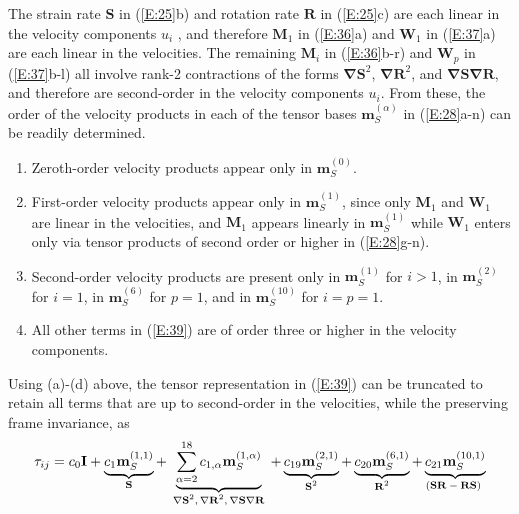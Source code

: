 The strain rate $\mathbf{S}$ in (\ref{E:25}b) and rotation rate $\mathbf{R}$ in (\ref{E:25}c) are each linear in the velocity components $u_i$ , and therefore  $\mathbf{M}_1$ in (\ref{E:36}a) and $\mathbf{W}_1$  in (\ref{E:37}a) are each linear in the velocities.  The remaining $\mathbf{M}_i$  in (\ref{E:36}b-r) and  $\mathbf{W}_p$ in (\ref{E:37}b-l) all involve rank-2 contractions of the forms $\mathbf{\nabla S}^2$, $\mathbf{\nabla R}^2$, and $\mathbf{\nabla S \nabla R}$, and therefore are second-order in the velocity components $u_i$.  From these, the order of the velocity products in each of the tensor bases $\mathbf{m}^{(\alpha)}_{S}$  in (\ref{E:28}a-n) can be readily determined.  
%
\begin{enumerate}[label=\emph({\alph*})]
%	
	\item	Zeroth-order velocity products appear only in $\mathbf{m}^{(0)}_{S}$.  
%	
	\item   First-order velocity products appear only in $\mathbf{m}^{(1)}_{S}$, since only   $\mathbf{M}_{1}$  and $\mathbf{W}_{1}$ are linear in the velocities, and $\mathbf{M}_{1}$   appears linearly in  $\mathbf{m}^{(1)}_{S}$ while  $\mathbf{W}_{1}$ enters only via tensor products of second order or higher in (\ref{E:28}g-n).  
%	
	\item   Second-order velocity products are present only in $\mathbf{m}^{(1)}_{S}$ for $i > 1$, in $\mathbf{m}^{(2)}_{S}$  for $i=1$, in  $\mathbf{m}^{(6)}_{S}$ for $p=1$, and in $\mathbf{m}^{(10)}_{S}$  for $i = p = 1$.
%	
	\item   All other terms in (\ref{E:39}) are of order three or higher in the velocity components.
%
\end{enumerate}
%
%   

Using (a)-(d) above, the tensor representation in (\ref{E:39}) can be truncated to retain all terms that are up to second-order in the velocities, while the preserving frame invariance, as
%
\begin{equation}
\label{E:41}
	\mathbf{\tau}_{ij} =  c_{0} \mathbf{I}
	+ \underbrace{
				c_{1} \mathbf{m}^{(1,1)}_{S}
				} %
				_{\text{\textbf{S}}}
	+ \underbrace{
				\sum_{\alpha=2}^{18} c_{1,\alpha} \mathbf{m}^{(1,\alpha)}_{S}
				 } %
				_{\text{ $ \mathbf{\nabla S}^{2}, \mathbf{\nabla R}^{2}, \mathbf{\nabla S \nabla R}$ }}
	+ \underbrace{
				c_{19} \mathbf{m}^{(2,1)}_{S}
				}%
				_{\text{ $\mathbf{S}^2$ }}
	+ \underbrace{
				c_{20} \mathbf{m}^{(6,1)}_{S}
				}%
				_{\text{ $\mathbf{R}^2$ }}
	+ \underbrace{
				c_{21} \mathbf{m}^{(10,1)}_{S}
				}%
				_{\text{$(\mathbf{SR-RS})$ }}
\end{equation}
%
%   

